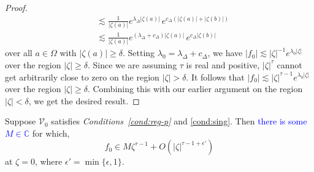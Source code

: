 \documentclass[review]{siamart220329}
\newcommand{\C}{\mathbb{C}}
\newcommand{\hardpart}{\mathcal{V}_0}
\newcommand{\solproto}{f_0}
\newcommand{\domain}{\Omega}
\begin{document}
\begin{proof}
\begin{align*}
& \lesssim \frac{1}{|\zeta(a)|} e^{\lambda_\Delta|\zeta(a)|}\,e^{c_\Delta(|\zeta(a)| + |\zeta(b)|)} \\
& \lesssim \frac{1}{|\zeta(a)|} e^{(\lambda_\Delta + c_\Delta)|\zeta(a)|}\,e^{c_\Delta|\zeta(b)|}
\end{align*}
over all $a \in \domain$ with $|\zeta(a)| \ge \delta$. Setting $\lambda_0 = \lambda_\Delta + c_\Delta$, we have $|\solproto| \lesssim |\zeta|^{-1} e^{\lambda_0|\zeta|}$ over the region $|\zeta| \ge \delta$. Since we are assuming $\tau$ is real and positive, $|\zeta|^\tau$ cannot get arbitrarily close to zero on the region $|\zeta| > \delta$. It follows that $|\solproto| \lesssim |\zeta|^{\tau-1} e^{\lambda_0|\zeta|}$ over the region $|\zeta| \ge \delta$. Combining this with our earlier argument on the region $|\zeta| < \delta$, we get the desired result.
\end{proof}
\begin{proposition}\label{prop:better-proto-estimate}
Suppose $\hardpart$ satisfies {\em Conditions~\eqref{cond:reg-p}} and \eqref{cond:sing}. Then \textcolor{blue}{there is some $M\in\C$} for which,
\[ \solproto \in M\zeta^{\tau-1} + O(|\zeta|^{\tau-1+\epsilon'}) \]
at $\zeta = 0$, where $\epsilon'=\min\{\epsilon, 1\}$.
\end{proposition}
\end{document}
